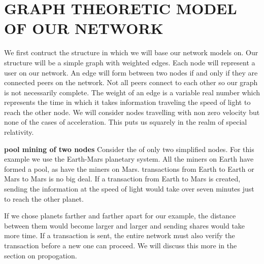 \documentclass[conference]{IEEEtran}
\begin{document}
\section{GRAPH THEORETIC MODEL OF OUR NETWORK}
We first contruct the structure in which we will base our network models on. Our structure will be a simple graph with weighted edges. Each node will represent a user on our network. An edge will form between two nodes if and only if they are connected peers on the network. Not all peers connect to each other so our graph is not necessarily complete. The weight of an edge is a variable real number which represents the time in which it takes information traveling the speed of light to reach the other node. We will consider nodes travelling with non zero velocity but none of the cases of acceleration. This puts us squarely in the realm of special relativity. 
 
\textbf{pool mining of two nodes} Consider the of only two simplified nodes. For this example we use the Earth-Mars planetary system. All the miners on Earth have formed a pool, as have the miners on Mars. transactions from Earth to Earth or Mars to Mars is no big deal. If a transaction from Earth to Mars is created, sending the information at the speed of light would take over seven minutes just to reach the other planet. 

If we chose planets farther and farther apart for our example, the distance between them would become larger and larger and sending shares would take more time. If a transaction is sent, the entire network must also verify the transaction before a new one can proceed. We will discuss this more in the section on propogation. \cite{template}
\end{document}
